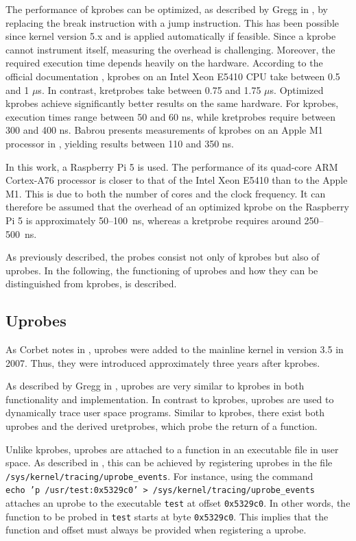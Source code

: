 The performance of \acp{kprobe} can be optimized, as described by Gregg in \cite[Chap. 2.7]{Gregg_2020}, by replacing the break instruction with a jump instruction.  
This has been possible since kernel version 5.x and is applied automatically if feasible.  
Since a \ac{kprobe} cannot instrument itself, measuring the overhead is challenging.  
Moreover, the required execution time depends heavily on the hardware.  
According to the official documentation \cite{kprobe_doc}, \acp{kprobe} on an Intel Xeon E5410 CPU take between 0.5 and 1 $\mu$s.  
In contrast, \acp{kretprobe} take between 0.75 and 1.75 $\mu$s.  
Optimized \acp{kprobe} achieve significantly better results on the same hardware.  
For \acp{kprobe}, execution times range between 50 and 60 ns, while \acp{kretprobe} require between 300 and 400 ns.  
Babrou presents measurements of \acp{kprobe} on an Apple M1 processor in \cite{k_probe_benchmark}, yielding results between 110 and 350 ns.  

In this work, a Raspberry Pi 5 is used.  
The performance of its quad-core ARM Cortex-A76 processor is closer to that of the Intel Xeon E5410 than to the Apple M1.  
This is due to both the number of cores and the clock frequency.  
It can therefore be assumed that the overhead of an optimized \ac{kprobe} on the Raspberry Pi 5 is approximately 50--100~ns, whereas a \ac{kretprobe} requires around 250--500~ns.

As previously described, the probes consist not only of \acp{kprobe} but also of \acp{uprobe}. 
In the following, the functioning of \acp{uprobe} and how they can be distinguished from \acp{kprobe}, is described.

\subsection{Uprobes}
As Corbet notes in \cite{uprobe}, \acp{uprobe} were added to the mainline kernel in version 3.5 in 2007. 
Thus, they were introduced approximately three years after \acp{kprobe}.

As described by Gregg in \cite[Chap. 2.8]{Gregg_2020}, \acp{uprobe} are very similar to \acp{kprobe} in both functionality and implementation.  
In contrast to \acp{kprobe}, \acp{uprobe} are used to dynamically trace user space programs.  
Similar to \acp{kprobe}, there exist both \acp{uprobe} and the derived \acp{uretprobe}, which probe the return of a function.  

Unlike \acp{kprobe}, \acp{uprobe} are attached to a function in an executable file in user space.  
As described in \cite{uprobe_doc}, this can be achieved by registering \acp{uprobe} in the file \\
\texttt{/sys/kernel/tracing/uprobe\_events}.  
For instance, using the command \\
\texttt{echo 'p /usr/test:0x5329c0' > /sys/kernel/tracing/uprobe\_events} attaches an \ac{uprobe} to the executable \texttt{test} at offset \texttt{0x5329c0}.  
In other words, the function to be probed in \texttt{test} starts at byte \texttt{0x5329c0}.  
This implies that the function and offset must always be provided when registering a \ac{uprobe}.  

